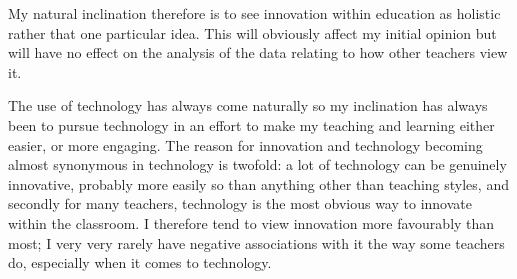 My natural inclination therefore is to see innovation within education as holistic rather that one particular idea. This will obviously affect my initial opinion but will have no effect on the analysis of the data relating to how other teachers view it.

The use of technology has always come naturally so my inclination has always been to pursue technology in an effort to make my teaching and learning either easier, or more engaging. The reason for innovation and technology becoming almost synonymous in technology is twofold: a lot of technology can be genuinely innovative, probably more easily so than anything other than teaching styles, and secondly for many teachers, technology is the most obvious way to innovate within the classroom. I therefore tend to view innovation more favourably than most; I very very rarely have negative associations with it the way some teachers do, especially when it comes to technology.

